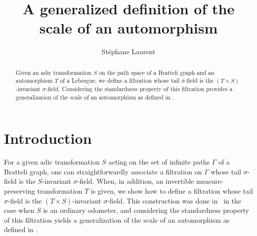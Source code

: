 \documentclass[12pt,a4paper]{article}
\author{Stéphane Laurent}
\title{A generalized definition of the scale of an automorphism}
\begin{document}
\theoremstyle{defstyle}
\newtheorem{definition}{Definition}
\newtheorem{remark}{Remark}
\newtheorem{question}{Question}
\newtheorem{clarify}{To clarify}
\theoremstyle{thmstyle}
\newtheorem{thm}{Theorem}[section]
\newtheorem{ppsition}{Proposition}
\newtheorem{lemma}{Lemma}

\newcommand{\BB}{\mathcal{B}}
\newcommand{\CC}{\mathcal{C}}
\newcommand{\EEE}{\mathcal{E}}
\newcommand{\FF}{\mathcal{F}}
\newcommand{\GG}{\mathcal{G}}
\newcommand{\tildGG}{\widetilde{\GG}}
\newcommand{\HH}{\mathcal{H}}
\newcommand{\EE}{\mathbb{E}}
\newcommand{\II}{\mathcal{I}}
\newcommand{\LL}{\mathcal{L}}
\newcommand{\OO}{\mathcal{O}}
\newcommand{\UU}{\mathcal{U}}
\newcommand{\XX}{\mathcal{X}}
\newcommand{\given}{\mid}
\newcommand{\eps}{\epsilon}
\newcommand{\indic}{\boldsymbol 1}
\newcommand{\Vb}{\boldsymbol V}
\newcommand{\tildV}{\widetilde{V}}
\newcommand{\tildW}{\widetilde{W}}
\newcommand{\tildX}{\widetilde{X}}
\newcommand{\tildeps}{\widetilde{\epsilon}}


\newcommand{\indvee}{\dot{\vee}}
\newcommand{\indep}{\mathrel{\text{\scalebox{1.07}{$\perp\mkern-10mu\perp$}}}}

\maketitle

\begin{abstract}
Given an adic transformation $S$ on the path space of a Bratteli graph and 
an automorphism $T$ of a Lebesgue, we define a filtration whose 
tail $\sigma$-field is the $(T \times S)$-invariant $\sigma$-field. 
Considering the standardness property of this filtration provides 
a generalization of the scale of an automorphism as defined in 
\cite{LauXLV}.
\end{abstract}

{\scriptsize 
\tableofcontents
}

\section{Introduction} 

For a given adic transformation $S$ acting on the set of infinite paths $\Gamma$ of a 
Bratteli graph, one can straightforwardly associate a filtration on $\Gamma$ whose 
tail $\sigma$-field is the $S$-invariant $\sigma$-field. 
When, in addition, an invertible measure-preserving transformation $T$ 
is given, we show how to define a filtration whose tail $\sigma$-field 
is the $(T\times S)$-invariant $\sigma$-field. 
This construction was done in~\cite{LauXLV} in the case when $S$ 
is an ordinary odometer, and considering the standardness property 
of this filtration yields  
a generalization of the scale of an automorphism as defined in 
\cite{LauXLV}.
 
\end{document}
